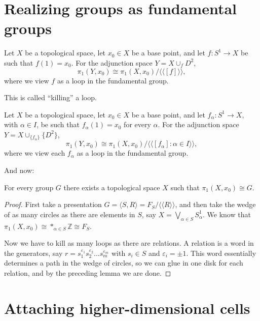 \section{Realizing groups as fundamental
groups}
\label{section-realizing-fundamental-groups}

\begin{lemma}
Let $X$ be a topological space, let $x_0\in
X$ be a base
point, and let $f:S^1\to X$ be such that
$f(1)=x_0$. For the
adjunction space $Y=X\cup_f D^2$,
$$
\pi_1(Y,x_0)\cong
\pi_1(X,x_0)\big/\langle\langle
[f]\rangle\rangle,
$$
where we view $f$ as a loop in the
fundamental group.
\end{lemma}

This is called ``killing'' a loop.

\begin{lemma}
Let $X$ be a topological space, let $x_0\in
X$ be a base
point, and let $f_\alpha:S^1\to X$, with
$\alpha\in I$, be
such that $f_\alpha(1)=x_0$ for every
$\alpha$. For the adjunction space
$Y=X\cup_{\{f_\alpha\}}\{D^2\}$,
$$
\pi_1(Y,x_0)\cong
\pi_1(X,x_0)
\big/
\langle\langle [f_\alpha]:\alpha\in
I\rangle\rangle,
$$
where we view each $f_\alpha$ as a loop in
the fundamental group.
\end{lemma}

And now:

\begin{theorem}
For every group $G$ there exists a
topological space $X$
such that $\pi_1(X,x_0)\cong G$.
\end{theorem}

\begin{proof}
First take a presentation
$G=\langle S,R\rangle=F_S/\langle\langle
R\rangle\rangle$,
and then take the wedge of as many circles as
there are
elements in $S$, say
$X=\bigvee_{\alpha\in S}S^1_\alpha$.
We know that
$\pi_1(X,x_0)\cong *_{\alpha\in
S}\mathbb{Z}\cong F_S$.

Now we have to kill as many loops as there
are relations. A
relation is a word in the generators, say
$r=s_1^{\varepsilon_1}
s_2^{\varepsilon_2}\ldots
s_m^{\varepsilon_m}$ with $s_i\in S$ and
$\varepsilon_i=\pm1$. This word essentially
determines a
path in the wedge of circles, so we can glue
in one disk for
each relation, and by the preceding lemma we
are done.
\end{proof}
\section{Attaching higher-dimensional cells}
\label{section-attaching-higher-cells}


